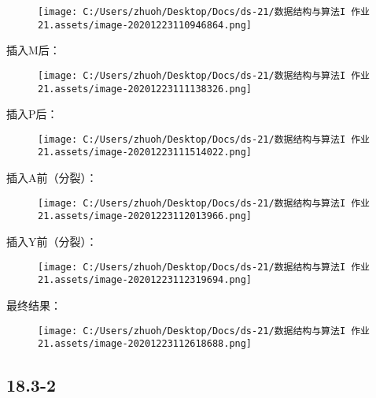 \documentclass[]{article}
\begin{document}
\begin{figure}
\centering
\texttt{[image: C:/Users/zhuoh/Desktop/Docs/ds-21/数据结构与算法I 作业21.assets/image-20201223110946864.png]}
\caption{}
\end{figure}

插入M后：

\begin{figure}
\centering
\texttt{[image: C:/Users/zhuoh/Desktop/Docs/ds-21/数据结构与算法I 作业21.assets/image-20201223111138326.png]}
\caption{}
\end{figure}

插入P后：

\begin{figure}
\centering
\texttt{[image: C:/Users/zhuoh/Desktop/Docs/ds-21/数据结构与算法I 作业21.assets/image-20201223111514022.png]}
\caption{}
\end{figure}

插入A前（分裂）：

\begin{figure}
\centering
\texttt{[image: C:/Users/zhuoh/Desktop/Docs/ds-21/数据结构与算法I 作业21.assets/image-20201223112013966.png]}
\caption{}
\end{figure}

插入Y前（分裂）：

\begin{figure}
\centering
\texttt{[image: C:/Users/zhuoh/Desktop/Docs/ds-21/数据结构与算法I 作业21.assets/image-20201223112319694.png]}
\caption{}
\end{figure}

最终结果：

\begin{figure}
\centering
\texttt{[image: C:/Users/zhuoh/Desktop/Docs/ds-21/数据结构与算法I 作业21.assets/image-20201223112618688.png]}
\caption{}
\end{figure}

\hypertarget{header-n105}{%
\subsection{18.3-2}\label{header-n105}}
\end{document}
